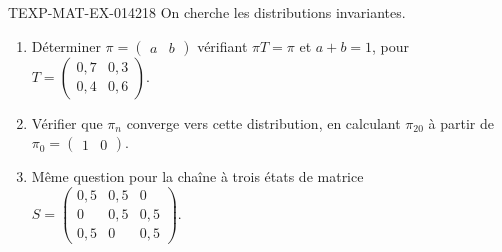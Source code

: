 \begin{exercice}{TEXP-MAT-EX-014}{2}{18}
On cherche les distributions invariantes.
\begin{enumerate}
  \item Déterminer $\pi=\begin{pmatrix}a&b\end{pmatrix}$ vérifiant $\pi T=\pi$
        et $a+b=1$, pour
        $T=\begin{pmatrix}0{,}7&0{,}3\\0{,}4&0{,}6\end{pmatrix}$.
  \item Vérifier que $\pi_n$ converge vers cette distribution, en calculant
        $\pi_{20}$ à partir de $\pi_0=\begin{pmatrix}1&0\end{pmatrix}$.
  \item Même question pour la chaîne à trois états de matrice
        $S=\begin{pmatrix}0{,}5&0{,}5&0\\0&0{,}5&0{,}5\\0{,}5&0&0{,}5\end{pmatrix}$.
\end{enumerate}
\end{exercice}
